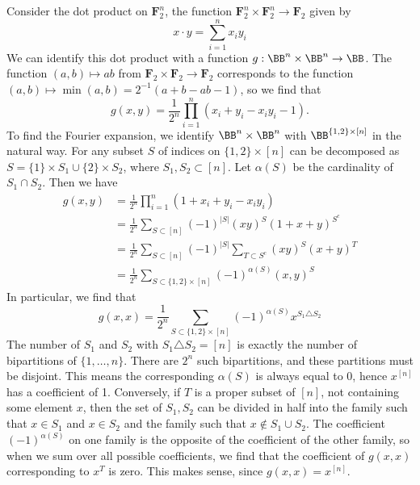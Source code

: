 \begin{example}
    Consider the dot product on $\mathbf{F}_2^n$, the function $\mathbf{F}_2^n \times \mathbf{F}_2^n \to \mathbf{F}_2$ given by
    \[ x \cdot y = \sum_{i = 1}^n x_iy_i \]
    We can identify this dot product with a function $g: \BB^n \times \BB^n \to \BB$. The function $(a,b) \mapsto ab$ from $\mathbf{F}_2 \times \mathbf{F}_2 \to \mathbf{F}_2$ corresponds to the function $(a,b) \mapsto \min(a,b) = 2^{-1} (a + b - ab - 1)$, so we find that
    \[ g(x,y) = \frac{1}{2^n} \prod_{i = 1}^n (x_i + y_i - x_iy_i - 1). \]
    To find the Fourier expansion, we identify $\BB^n \times \BB^n$ with $\BB^{\{ 1, 2 \} \times [n]}$ in the natural way. For any subset $S$ of indices on $\{ 1, 2 \} \times [n]$ can be decomposed as $S = \{ 1 \} \times S_1 \cup \{ 2 \} \times S_2$, where $S_1, S_2 \subset [n]$. Let $\alpha(S)$ be the cardinality of $S_1 \cap S_2$. Then we have
    \begin{align*}
        g(x,y) &= \frac{1}{2^n} \prod_{i = 1}^n (1 + x_i + y_i - x_iy_i)\\
        &= \frac{1}{2^n} \sum_{S \subset [n]} (-1)^{|S|} (xy)^S (1 + x + y)^{S^c}\\
        &= \frac{1}{2^n} \sum_{S \subset [n]} (-1)^{|S|} \sum_{T \subset S^c} (xy)^S (x + y)^T\\
        &= \frac{1}{2^n} \sum_{S \subset \{ 1, 2 \} \times [n]} (-1)^{\alpha(S)} (x,y)^S
    \end{align*}
    In particular, we find that
    \[ g(x,x) = \frac{1}{2^n} \sum_{S \subset \{ 1, 2 \} \times [n]} (-1)^{\alpha(S)} x^{S_1 \triangle S_2} \]
    The number of $S_1$ and $S_2$ with $S_1 \triangle S_2 = [n]$ is exactly the number of bipartitions of $\{ 1, \dots, n \}$. There are $2^n$ such bipartitions, and these partitions must be disjoint. This means the corresponding $\alpha(S)$ is always equal to 0, hence $x^{[n]}$ has a coefficient of 1. Conversely, if $T$ is a proper subset of $[n]$, not containing some element $x$, then the set of $S_1,S_2$ can be divided in half into the family such that $x \in S_1$ and $x \in S_2$ and the family such that $x \not \in S_1 \cup S_2$. The coefficient $(-1)^{\alpha(S)}$ on one family is the opposite of the coefficient of the other family, so when we sum over all possible coefficients, we find that the coefficient of $g(x,x)$ corresponding to $x^T$ is zero. This makes sense, since $g(x,x) = x^{[n]}$.
\end{example}

